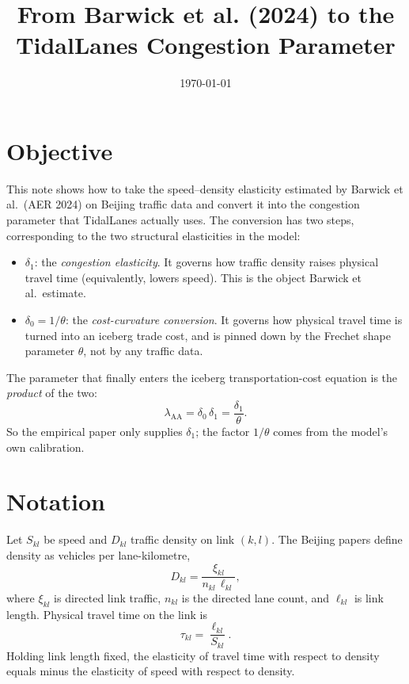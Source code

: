 \documentclass[11pt]{article}
\title{From Barwick et al. (2024) to the TidalLanes Congestion Parameter}
\author{}
\date{\today}
\begin{document}
\maketitle

\section{Objective}

This note shows how to take the speed--density elasticity estimated by
Barwick et al.\ (AER 2024) on Beijing traffic data and convert it into the
congestion parameter that TidalLanes actually uses. The conversion has two
steps, corresponding to the two structural elasticities in the model:
\begin{itemize}
\item $\delta_1$: the \emph{congestion elasticity}. It governs how traffic
density raises physical travel time (equivalently, lowers speed). This is the
object Barwick et al.\ estimate.
\item $\delta_0=1/\theta$: the \emph{cost-curvature conversion}. It governs how
physical travel time is turned into an iceberg trade cost, and is pinned down
by the Frechet shape parameter $\theta$, not by any traffic data.
\end{itemize}
The parameter that finally enters the iceberg transportation-cost equation is
the \emph{product} of the two:
\begin{equation}
\lambda_{\mathrm{AA}}=\delta_0\,\delta_1=\frac{\delta_1}{\theta}.
\end{equation}
So the empirical paper only supplies $\delta_1$; the factor $1/\theta$ comes
from the model's own calibration.

\section{Notation}

Let $S_{kl}$ be speed and $D_{kl}$ traffic density on link $(k,l)$. The Beijing
papers define density as vehicles per lane-kilometre,
\begin{equation}
D_{kl}=\frac{\xi_{kl}}{n_{kl}\,\ell_{kl}},
\end{equation}
where $\xi_{kl}$ is directed link traffic, $n_{kl}$ is the directed lane count,
and $\ell_{kl}$ is link length. Physical travel time on the link is
\begin{equation}
\tau_{kl}=\frac{\ell_{kl}}{S_{kl}}.
\end{equation}
Holding link length fixed, the elasticity of travel time with respect to
density equals minus the elasticity of speed with respect to density.
\end{document}
